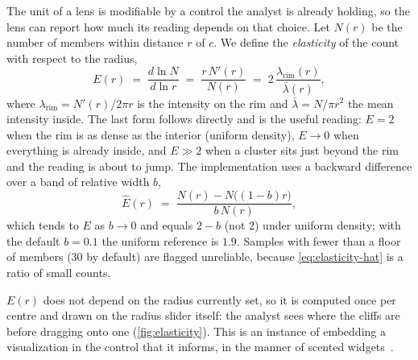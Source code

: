 The unit of a lens is modifiable by a control the analyst is already holding,
so the lens can report how much its reading depends on that choice. Let $N(r)$
be the number of members within distance $r$ of $c$. We define the
\emph{elasticity} of the count with respect to the radius,
\begin{equation}
  E(r) \;=\; \frac{d\ln N}{d\ln r} \;=\; \frac{r\,N'(r)}{N(r)}
  \;=\; 2\,\frac{\lambda_{\mathrm{rim}}(r)}{\bar\lambda(r)},
  \label{eq:elasticity}
\end{equation}
where $\lambda_{\mathrm{rim}}=N'(r)/2\pi r$ is the intensity on the rim and
$\bar\lambda=N/\pi r^2$ the mean intensity inside. The last form follows
directly and is the useful reading: $E=2$ when the rim is as dense as the
interior (uniform density), $E\to 0$ when everything is already inside, and
$E\gg2$ when a cluster sits just beyond the rim and the reading is about to
jump. The implementation uses a backward difference over a band of relative
width $b$,
\begin{equation}
  \hat E(r) \;=\; \frac{N(r)-N\big((1-b)r\big)}{b\,N(r)},
  \label{eq:elasticity-hat}
\end{equation}
which tends to $E$ as $b\to0$ and equals $2-b$ (not $2$) under uniform density;
with the default $b=0.1$ the uniform reference is $1.9$. Samples with fewer than
a floor of members (30 by default) are flagged unreliable, because
\cref{eq:elasticity-hat} is a ratio of small counts.

$E(r)$ does not depend on the radius currently set, so it is computed once per
centre and drawn on the radius slider itself: the analyst sees where the cliffs
are before dragging onto one (\cref{fig:elasticity}). This is an instance of
embedding a visualization in the control that it informs, in the manner of
scented widgets~\cite{willett2007scented}.

